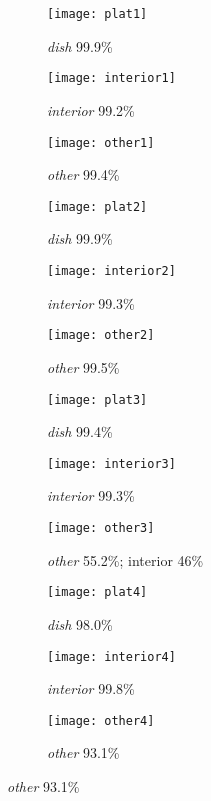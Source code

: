 \documentclass[11pt, oneside]{article}   	%
\begin{document}
\begin{figure}
\centering
\begin{subfigure}{.3\textwidth}
	\centering
	\texttt{[image: plat1]}
	\caption{\textit{dish} 99.9\%}
	\label{A subfigure label}
\end{subfigure}%
\begin{subfigure}{.3\textwidth}
	\centering
	\texttt{[image: interior1]}
	\caption{\textit{interior} 99.2\%}
	\label{A subfigure label}
\end{subfigure}%
\begin{subfigure}{.3\textwidth}
	\centering
	\texttt{[image: other1]}
	\caption{\textit{other} 99.4\%}
	\label{A subfigure label}
\end{subfigure}

\begin{subfigure}{.3\textwidth}
	\centering
	\texttt{[image: plat2]}
	\caption{\textit{dish} 99.9\%}
	\label{A subfigure label}
\end{subfigure}%
\begin{subfigure}{.3\textwidth}
	\centering
	\texttt{[image: interior2]}
	\caption{\textit{interior} 99.3\%}
	\label{A subfigure label}
\end{subfigure}%
\begin{subfigure}{.3\textwidth}
	\centering
	\texttt{[image: other2]}
	\caption{\textit{other} 99.5\%}
	\label{A subfigure label}
\end{subfigure}

\begin{subfigure}{.3\textwidth}
	\centering
	\texttt{[image: plat3]}
	\caption{\textit{dish} 99.4\%}
	\label{A subfigure label}
\end{subfigure}%
\begin{subfigure}{.3\textwidth}
	\centering
	\texttt{[image: interior3]}
	\caption{\textit{interior} 99.3\%}
	\label{A subfigure label}
\end{subfigure}%
\begin{subfigure}{.3\textwidth}
	\centering
	\texttt{[image: other3]}
	\caption{\textit{other} 55.2\%; interior 46\%}
	\label{A subfigure label}
\end{subfigure}

\begin{subfigure}{.3\textwidth}
	\centering
	\texttt{[image: plat4]}
	\caption{\textit{dish} 98.0\%}
	\label{A subfigure label}
\end{subfigure}%
\begin{subfigure}{.3\textwidth}
	\centering
	\texttt{[image: interior4]}
	\caption{\textit{interior} 99.8\%}
	\label{A subfigure label}
\end{subfigure}%
\begin{subfigure}{.3\textwidth}
	\centering
	\texttt{[image: other4]}
	\caption{\textit{other} 93.1\%}
	\label{A subfigure label}
\end{subfigure}


\end{figure}
\end{document}
